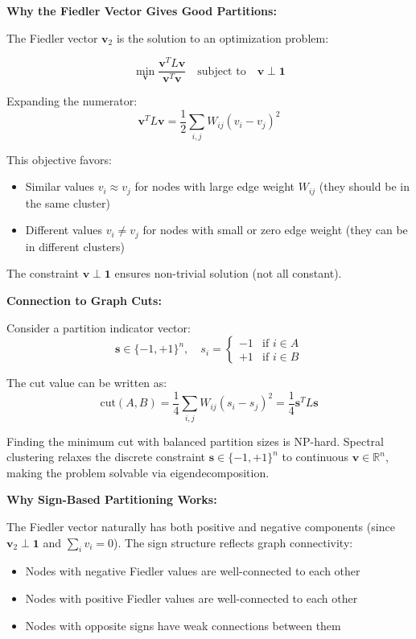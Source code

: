 \documentclass[12pt]{article}
\begin{document}
\begin{explanation}

\textbf{Why the Fiedler Vector Gives Good Partitions:}

The Fiedler vector $\mathbf{v}_2$ is the solution to an optimization problem:

\[
\min_{\mathbf{v}} \frac{\mathbf{v}^T L \mathbf{v}}{\mathbf{v}^T \mathbf{v}} \quad \text{subject to} \quad \mathbf{v} \perp \mathbf{1}
\]

Expanding the numerator:
\[
\mathbf{v}^T L \mathbf{v} = \frac{1}{2}\sum_{i,j} W_{ij}(v_i - v_j)^2
\]

This objective favors:
\begin{itemize}
    \item Similar values $v_i \approx v_j$ for nodes with large edge weight $W_{ij}$ (they should be in the same cluster)
    \item Different values $v_i \neq v_j$ for nodes with small or zero edge weight (they can be in different clusters)
\end{itemize}

The constraint $\mathbf{v} \perp \mathbf{1}$ ensures non-trivial solution (not all constant).

\textbf{Connection to Graph Cuts:}

Consider a partition indicator vector:
\[
\mathbf{s} \in \{-1, +1\}^n, \quad s_i = \begin{cases} -1 & \text{if } i \in A \\ +1 & \text{if } i \in B \end{cases}
\]

The cut value can be written as:
\[
\text{cut}(A, B) = \frac{1}{4}\sum_{i,j} W_{ij}(s_i - s_j)^2 = \frac{1}{4}\mathbf{s}^T L \mathbf{s}
\]

Finding the minimum cut with balanced partition sizes is NP-hard. Spectral clustering relaxes the discrete constraint $\mathbf{s} \in \{-1, +1\}^n$ to continuous $\mathbf{v} \in \mathbb{R}^n$, making the problem solvable via eigendecomposition.

\textbf{Why Sign-Based Partitioning Works:}

The Fiedler vector naturally has both positive and negative components (since $\mathbf{v}_2 \perp \mathbf{1}$ and $\sum_i v_i = 0$). The sign structure reflects graph connectivity:

\begin{itemize}
    \item Nodes with negative Fiedler values are well-connected to each other
    \item Nodes with positive Fiedler values are well-connected to each other
    \item Nodes with opposite signs have weak connections between them
\end{itemize}


\end{explanation}
\end{document}
